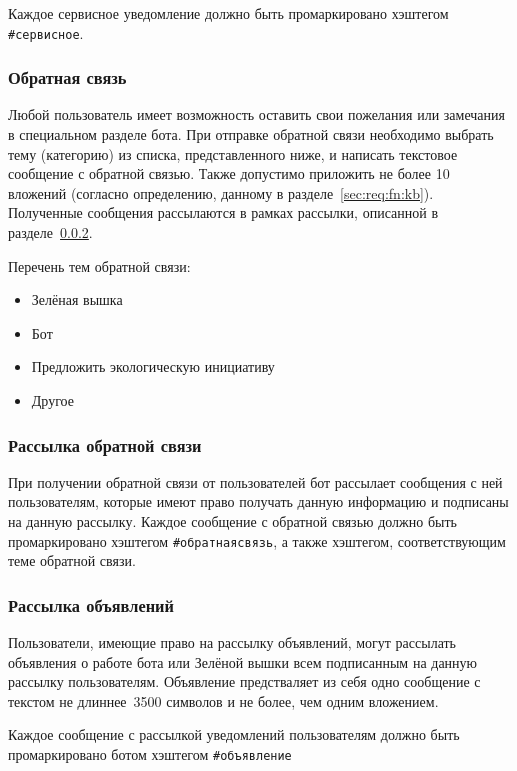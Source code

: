     Каждое сервисное уведомление должно быть промаркировано хэштегом \hbox{\texttt{\#сервисное}}.

\subsubsection{Обратная связь}
    \label{sec:req:fn:feedback}
    Любой пользователь имеет возможность оставить свои пожелания или замечания в специальном
    разделе бота. При отправке обратной связи необходимо выбрать тему (категорию) из списка,
    представленного ниже, и написать текстовое сообщение с обратной связью.
    Также допустимо приложить не более 10 вложений (согласно определению, данному в
    разделе~\ref{sec:req:fn:kb}). Полученные сообщения рассылаются в рамках рассылки,
    описанной в разделе~\ref{sec:req:fn:feedbacknl}.

    Перечень тем обратной связи:
    \begin{itemize}
        \item
            Зелёная вышка
        \item
            Бот
        \item
            Предложить экологическую инициативу
        \item
            Другое
    \end{itemize}

\subsubsection{Рассылка обратной связи}
    \label{sec:req:fn:feedbacknl}
    При получении обратной связи от пользователей бот рассылает сообщения с ней пользователям,
    которые имеют право получать данную информацию и подписаны на данную рассылку.
    Каждое сообщение с обратной связью должно быть промаркировано хэштегом \hbox{\texttt{\#обратнаясвязь}},
    а также хэштегом, соответствующим теме обратной связи.

\subsubsection{Рассылка объявлений}
    \label{sec:req:fn:announce}
    Пользователи, имеющие право на рассылку объявлений, могут
    рассылать объявления о работе бота или Зелёной вышки всем подписанным на данную рассылку
    пользователям. Объявление предстваляет из себя одно сообщение с текстом не длиннее~3500 символов
    и не более, чем одним вложением.

    Каждое сообщение с рассылкой уведомлений пользователям должно быть промаркировано ботом хэштегом
    \hbox{\texttt{\#объявление}}

